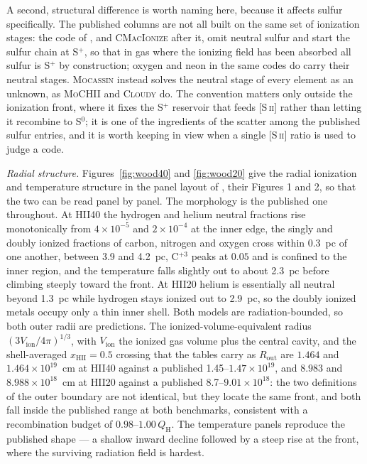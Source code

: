 \documentclass[twocolumn,linenumbers]{aastex702}
\newcommand{\MoCHII}{\textsc{MoCHII}}
\newcommand{\QH}{Q_{\mathrm{H}}}
\begin{document}
A second, structural difference is worth naming here, because it affects
sulfur specifically.  The published columns are not all built on the same
set of ionization stages: the code of \citet{wood2004}, and
\textsc{CMacIonize} after it, omit neutral sulfur and start the sulfur
chain at S$^{+}$, so that in gas where the ionizing field has been absorbed
all sulfur is S$^{+}$ by construction; oxygen and neon in the same codes do
carry their neutral stages.  \textsc{Mocassin} instead solves the neutral
stage of every element as an unknown, as \MoCHII{} and \textsc{Cloudy} do.
The convention matters only outside the ionization front, where it fixes
the S$^{+}$ reservoir that feeds [S\,\textsc{ii}] rather than letting it
recombine to S$^{0}$; it is one of the ingredients of the scatter among the
published sulfur entries, and it is worth keeping in view when a single
[S\,\textsc{ii}] ratio is used to judge a code.

\emph{Radial structure.}  Figures~\ref{fig:wood40} and \ref{fig:wood20}
give the radial ionization and temperature structure in the panel layout of
\citet{wood2004}, their Figures 1 and 2, so that the two can be read panel
by panel.  The morphology is the published one throughout.  At HII40 the
hydrogen and helium neutral fractions rise monotonically from
$4\times10^{-5}$ and $2\times10^{-4}$ at the inner edge, the singly and
doubly ionized fractions of carbon, nitrogen and oxygen cross within
0.3~pc of one another, between 3.9 and 4.2~pc, C$^{+3}$ peaks at $0.05$ and is
confined to the inner region, and the temperature falls slightly out to
about 2.3~pc before climbing steeply toward the front.  At HII20 helium is
essentially all neutral beyond
1.3~pc while hydrogen stays ionized out to 2.9~pc, so the doubly ionized
metals occupy only a thin inner shell.  Both models are radiation-bounded,
so both outer radii are predictions.  The ionized-volume-equivalent radius
$(3V_{\mathrm{ion}}/4\pi)^{1/3}$, with $V_{\mathrm{ion}}$ the ionized gas
volume plus the central cavity, and the shell-averaged
$x_{\mathrm{HII}} = 0.5$ crossing that the tables carry as
$R_{\mathrm{out}}$ are $1.464$ and $1.464\times10^{19}$~cm at HII40 against
a published 1.45--$1.47\times10^{19}$, and $8.983$ and
$8.988\times10^{18}$~cm at HII20 against a published
8.7--$9.01\times10^{18}$: the two definitions of the outer boundary are not
identical, but they locate the same front, and both fall inside the
published range at both benchmarks, consistent with a recombination budget
of $0.98$--$1.00\,\QH$.  The temperature panels
reproduce the published shape --- a shallow inward decline followed by a
steep rise at the front, where the surviving radiation field is hardest.
\end{document}

